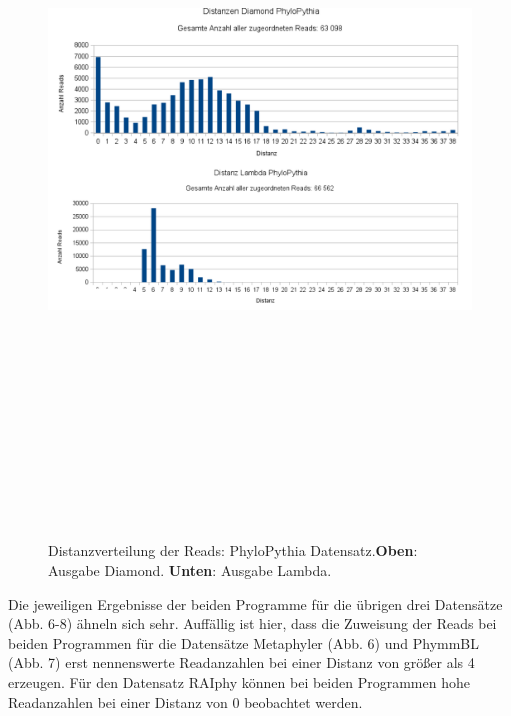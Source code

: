 \documentclass[10pt, a4paper]{article}[08.12.2015]
\begin{document}
     \begin{figure}[H]
      \centering
      \noindent\includegraphics[width=\linewidth,height=20cm,
      keepaspectratio]{Abbildungen/PhyloPythia_Distanzen_both.png}
      \caption[Distanzverteilung der Reads: PhyloPythia Datensatz.]{\small{Distanzverteilung der Reads: PhyloPythia Datensatz.\newline \textbf{Oben}: Ausgabe Diamond. \textbf{Unten}: Ausgabe Lambda.}}
    \end{figure}
    Die jeweiligen Ergebnisse der beiden Programme f\"ur die \"ubrigen drei 		Datens\"atze (Abb. 6-8) \"ahneln sich sehr. Auff\"allig ist hier, dass
    die Zuweisung der Reads bei beiden Programmen f\"ur die Datens\"atze 			Metaphyler (Abb. 6) und PhymmBL (Abb. 7) erst nennenswerte Readanzahlen 		bei einer Distanz von gr\"o{\ss}er als 4 erzeugen. F\"ur den Datensatz
    RAIphy k\"onnen bei beiden Programmen hohe Readanzahlen bei einer Distanz
    von 0 beobachtet werden.    
\end{document}
